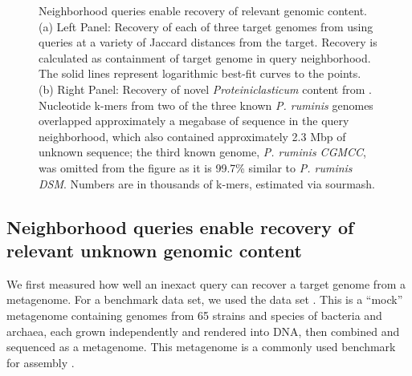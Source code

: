 \begin{figure}
  \centering
  \hspace*{2cm}%
  \hspace*{1cm}%
	\caption{Neighborhood queries enable recovery of relevant genomic content.
  (a) Left Panel: Recovery of each of three target genomes from \podarv
  using queries at a variety of Jaccard distances from the target. Recovery is
  calculated as containment of target genome in query neighborhood. The solid lines represent logarithmic best-fit curves to the points.
  (b) Right Panel: Recovery of novel {\em Proteiniclasticum } content
  from \podarv. Nucleotide k-mers from two of the three known {\em P. ruminis} genomes
  overlapped approximately a megabase of sequence in the query neighborhood,
  which also contained approximately 2.3 Mbp of unknown sequence; the third known genome, {\em P. ruminis CGMCC}, was omitted from the figure as it is 99.7\% similar to {\em P. ruminis DSM}. Numbers are in thousands of k-mers, estimated via sourmash.}\label{fig:partial_query}
\end{figure}



\subsection*{Neighborhood queries enable recovery of relevant unknown genomic content}

We first measured how well an inexact query can recover a target genome
from a metagenome. For a benchmark data set, we used the
\podarv data set \cite{podar}. This is a ``mock'' metagenome containing
genomes from 65 strains and species of bacteria and archaea, each
grown independently and rendered into DNA, then combined and sequenced
as a metagenome.  This metagenome is a commonly used
benchmark for assembly \cite{Awad155358,megahit,Seah2015,nurk2017metaspades}.

